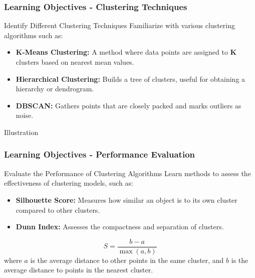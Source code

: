 \documentclass[aspectratio=169]{beamer}
\begin{document}
\begin{frame}[fragile]
    \frametitle{Learning Objectives - Clustering Techniques}
    \begin{block}{Identify Different Clustering Techniques}
        Familiarize with various clustering algorithms such as:
        \begin{itemize}
            \item \textbf{K-Means Clustering:} A method where data points are assigned to \textbf{K} clusters based on nearest mean values.
            \item \textbf{Hierarchical Clustering:} Builds a tree of clusters, useful for obtaining a hierarchy or dendrogram.
            \item \textbf{DBSCAN:} Gathers points that are closely packed and marks outliers as noise.
        \end{itemize}
    \end{block}
    
    \begin{block}{Illustration}
    \end{block}
\end{frame}

\begin{frame}[fragile]
    \frametitle{Learning Objectives - Performance Evaluation}
    \begin{block}{Evaluate the Performance of Clustering Algorithms}
        Learn methods to assess the effectiveness of clustering models, such as:
        \begin{itemize}
            \item \textbf{Silhouette Score:} Measures how similar an object is to its own cluster compared to other clusters.
            \item \textbf{Dunn Index:} Assesses the compactness and separation of clusters.
        \end{itemize}
        
        \begin{equation}
            S = \frac{b - a}{\max(a, b)}
        \end{equation}
        where \( a \) is the average distance to other points in the same cluster, and \( b \) is the average distance to points in the nearest cluster.
    \end{block}
\end{frame}
\end{document}

